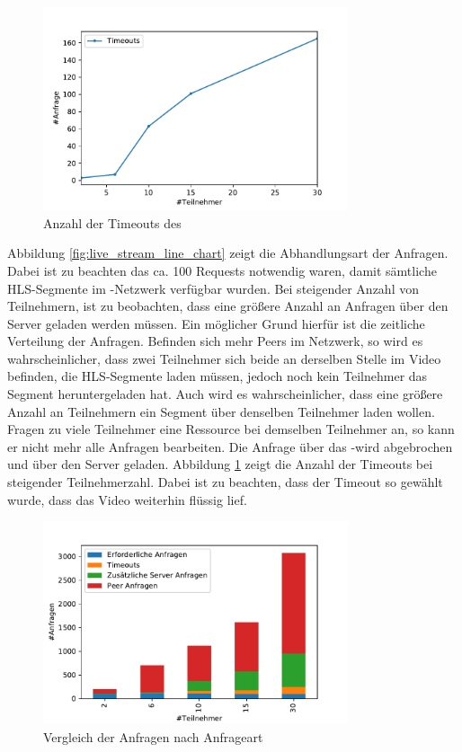 \begin{figure}[!h]
	\centering
	\includegraphics[width=0.8\textwidth]{figures/timeouts}
	\caption[Anzahl der Timeouts des \cdns]{Anzahl der Timeouts des \cdns}
	\label{fig:timeouts}
\end{figure}


Abbildung \ref{fig:live_stream_line_chart} zeigt die Abhandlungsart der Anfragen. Dabei ist zu beachten das ca. 100 Requests notwendig waren, damit sämtliche HLS-Segmente im \pTp-Netzwerk verfügbar wurden. Bei steigender Anzahl von Teilnehmern, ist zu beobachten, dass eine größere Anzahl an Anfragen über den Server geladen werden müssen. Ein möglicher Grund hierfür ist die zeitliche Verteilung der Anfragen. Befinden sich mehr Peers im Netzwerk, so wird es wahrscheinlicher, dass zwei Teilnehmer sich beide an derselben Stelle im Video befinden, die HLS-Segmente laden müssen, jedoch noch kein Teilnehmer das Segment heruntergeladen hat. Auch wird es wahrscheinlicher, dass eine größere Anzahl an Teilnehmern ein Segment über denselben Teilnehmer laden wollen. Fragen zu viele Teilnehmer eine Ressource bei demselben Teilnehmer an, so kann er nicht mehr alle Anfragen bearbeiten. Die Anfrage über das \pTp-\cdn wird abgebrochen und über den Server geladen. Abbildung \ref{fig:timeouts} zeigt die Anzahl der Timeouts bei steigender Teilnehmerzahl. Dabei ist zu beachten, dass der Timeout so gewählt wurde, dass das Video weiterhin flüssig lief.


\begin{figure}[!h]
	\centering
	\includegraphics[width=0.8\textwidth]{figures/anfragen_verteilung_bar}
	\caption[Vergleich der Anfragen nach Anfrageart]{Vergleich der Anfragen nach Anfrageart}
	\label{fig:anfragen_verteilung_bar}
\end{figure}


